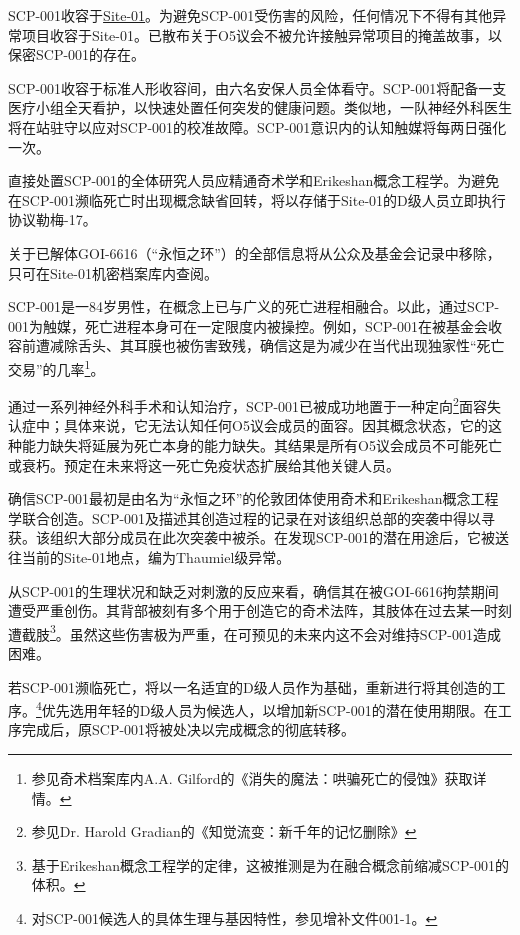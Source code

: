 SCP-001收容于\hyperref[chap:GUIDE-secure-facilities-locations]{Site-01}。为避免SCP-001受伤害的风险，任何情况下不得有其他异常项目收容于Site-01。已散布关于O5议会不被允许接触异常项目的掩盖故事，以保密SCP-001的存在。

SCP-001收容于标准人形收容间，由六名安保人员全体看守。SCP-001将配备一支医疗小组全天看护，以快速处置任何突发的健康问题。类似地，一队神经外科医生将在站驻守以应对SCP-001的校准故障。SCP-001意识内的认知触媒将每两日强化一次。

直接处置SCP-001的全体研究人员应精通奇术学和Erikeshan概念工程学。为避免在SCP-001濒临死亡时出现概念缺省回转，将以存储于Site-01的D级人员立即执行协议勒梅-17。

关于已解体GOI-6616（“永恒之环”）的全部信息将从公众及基金会记录中移除，只可在Site-01机密档案库内查阅。

SCP-001是一84岁男性，在概念上已与广义的死亡进程相融合。以此，通过SCP-001为触媒，死亡进程本身可在一定限度内被操控。例如，SCP-001在被基金会收容前遭减除舌头、其耳膜也被伤害致残，确信这是为减少在当代出现独家性“死亡交易”的几率\footnote{参见奇术档案库内A.A. Gilford的《消失的魔法：哄骗死亡的侵蚀》获取详情。}。

通过一系列神经外科手术和认知治疗，SCP-001已被成功地置于一种定向\footnote{参见Dr. Harold Gradian的《知觉流变：新千年的记忆删除》}面容失认症中；具体来说，它无法认知任何O5议会成员的面容。因其概念状态，它的这种能力缺失将延展为死亡本身的能力缺失。其结果是所有O5议会成员不可能死亡或衰朽。预定在未来将这一死亡免疫状态扩展给其他关键人员。

确信SCP-001最初是由名为“永恒之环”的伦敦团体使用奇术和Erikeshan概念工程学联合创造。SCP-001及描述其创造过程的记录在对该组织总部的突袭中得以寻获。该组织大部分成员在此次突袭中被杀。在发现SCP-001的潜在用途后，它被送往当前的Site-01地点，编为Thaumiel级异常。

从SCP-001的生理状况和缺乏对刺激的反应来看，确信其在被GOI-6616拘禁期间遭受严重创伤。其背部被刻有多个用于创造它的奇术法阵，其肢体在过去某一时刻遭截肢\footnote{基于Erikeshan概念工程学的定律，这被推测是为在融合概念前缩减SCP-001的体积。}。虽然这些伤害极为严重，在可预见的未来内这不会对维持SCP-001造成困难。

若SCP-001濒临死亡，将以一名适宜的D级人员作为基础，重新进行将其创造的工序。\footnote{对SCP-001候选人的具体生理与基因特性，参见增补文件001-1。}优先选用年轻的D级人员为候选人，以增加新SCP-001的潜在使用期限。在工序完成后，原SCP-001将被处决以完成概念的彻底转移。



